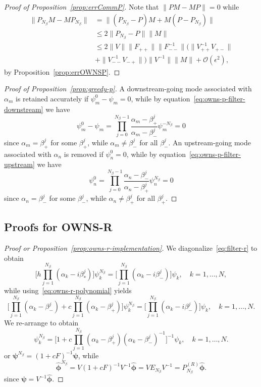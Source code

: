 \begin{proof}[Proof of Proposition~\ref{prop:errCommP}]
    Note that $\|PM-MP\|=0$ while
    \begin{align*}
    \|P_{N_\beta}M-MP_{N_\beta}\|
    &=
    \|(P_{N_\beta}-P)M+M(P-P_{N_\beta})\|\\
    &\leq
    2\|P_{N_\beta}-P\|\|M\|\\
    &\leq
    2\|V\|\|F_{++}\|\|F_{--}^{-1}\|\big(\|V_{++}^{-1}V_{+-}\|\\
    &+\|V_{--}^{-1}V_{-+}\|\big)\|V^{-1}\|\|M\|+\mathcal{O}(\epsilon^2),
    \end{align*}
    by Proposition~\ref{prop:errOWNSP}.
\end{proof}

\begin{proof}[Proof of Proposition~\ref{prop:greedy-p}]
    A downstream-going mode associated with $\alpha_m$ is retained accurately if $\psi_m^0-\psi_m=0$, while by equation~\eqref{eq:owns-p-filter-downstream} we have
    \[
    \psi_m^{0}-\psi_m=\prod_{j=0}^{N_\beta-1}\frac{\alpha_m - \beta_+^j}{\alpha_m- \beta_-^{j}}\psi_m^{-N_\beta}=0
    \]
    since $\alpha_m=\beta_+^j$ for some $\beta_+^j$, while $\alpha_m\neq\beta_-^j$ for all $\beta_-^j$. An upstream-going mode associated with $\alpha_n$ is removed if $\psi_n^0=0$, while by equation~\eqref{eq:owns-p-filter-upstream} we have
    \[
    \psi_n^0=\prod_{j=0}^{N_\beta-1}\frac{\alpha_n - \beta_-^j}{\alpha_n- \beta_+^{j}}\psi_n^{ N_\beta}=0
    \]
    since $\alpha_n=\beta_-^j$ for some $\beta_-^j$, while $\alpha_n\neq\beta_+^j$ for all $\beta_+^j$.
\end{proof}


\subsection{Proofs for OWNS-R}\label{app:Proofs-R}

\begin{proof}[Proof or Proposition~\ref{prop:owns-r-implementation}]
    We diagonalize~\eqref{eq:filter-r} to obtain
    \[
    \big[h\prod_{j=1}^{N_\beta}(\alpha_k-i\beta_*^j)\big]\psi_k^{N_\beta}
    =\big[\prod_{j=1}^{N_\beta}(\alpha_k-i\beta_-^j)\big]\psi_k,\quad k=1,\dots,N,
    \]
    while using~\eqref{eq:owns-r-polynomial} yields
    \[
    \big[\prod_{j=1}^{N_\beta}(\alpha_k-\beta_-^j)+c\prod_{j=1}^{N_\beta}(\alpha_k-\beta_+^j)]\psi_k^{N_\beta}
    =\big[\prod_{j=1}^{N_\beta}(\alpha_k-i\beta_-^j)\big]\psi_k,\quad k=1,\dots,N.
    \]
    We re-arrange to obtain
    \[
    \psi_k^{N_\beta}
    =\big[1+c\prod_{j=1}^{N_\beta}(\alpha_k-\beta_+^j)(\alpha_k-\beta_-^j)^{-1}]^{-1}\psi_k,\quad k=1,\dots,N.
    \]
    or $\bm{\psi}^{N_\beta}=(1+cF)^{-1}\bm{\psi}$, while
    \[
    \hat{\bm{\phi}}^{N_\beta}
    =V(1+cF)^{-1}V^{-1}\hat{\bm{\phi}}
    =VE_{N_\beta}V^{-1}
    =P_{N_\beta}^{(R)}\hat{\bm{\phi}}.
    \]
    since $\bm{\psi}=V^{-1}\hat{\bm{\phi}}$.
\end{proof}

